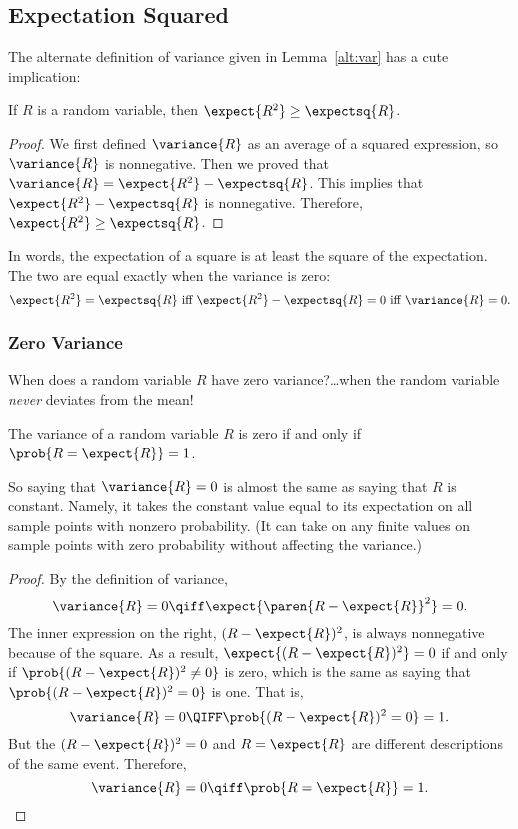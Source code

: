 \begin{editingnotes}
\subsection{Expectation Squared}

The alternate definition of variance given in Lemma~\ref{alt:var} has
a cute implication:
\begin{corollary}
If $R$ is a random variable, then $\expect{R^2} \geq \expectsq{R}$.
\end{corollary}
\begin{proof}
We first defined $\variance{R}$ as an average of a squared expression, so
$\variance{R}$ is nonnegative.  Then we proved that $\variance{R} =
\expect{R^2} - \expectsq{R}$.  This implies that $\expect{R^2} -
\expectsq{R}$ is nonnegative.  Therefore, $\expect{R^2} \geq
\expectsq{R}$.
\end{proof}

In words, the expectation of a square is at least the square of the
expectation. The two are equal exactly when the variance is zero:
\begin{displaymath}
\expect{R^2} = \expectsq{R} \text{  iff  } \expect{R^2} - \expectsq{R} = 0
\text{  iff  } \variance{R} = 0.
\end{displaymath}

\subsubsection*{Zero Variance}

When does a random variable $R$ have zero variance?\dots when the random
variable \emph{never} deviates from the mean!
\begin{lemma*}%
The variance of a random variable $R$ is zero if and only if $\prob{R =
\expect{R}} = 1$.
\end{lemma*}

So saying that $\variance{R}=0$ is almost the same as saying that $R$ is
constant.  Namely, it takes the constant value equal to its expectation on
all sample points with nonzero probability.  (It can take on any finite
values on sample points with zero probability without affecting the
variance.)

\begin{proof}
By the definition of variance,
\[
\variance{R} = 0\qiff \expect{\paren{R - \expect{R}}^2} = 0.
\]
The inner expression on the right, $(R - \expect{R})^2$, is always
nonnegative because of the square.  As a result, $\expect{(R -
\expect{R})^2} = 0$ if and only if $\prob{(R - \expect{R})^2 \neq 0}$ is
zero, which is the same as saying that $\prob{(R - \expect{R})^2 = 0}$ is
one.  That is,
\[
\variance{R} = 0 \QIFF \prob{(R - \expect{R})^2 = 0} = 1.
\]
But the $(R - \expect{R})^2 = 0$ and $R = \expect{R}$ are different
descriptions of the same event.  Therefore,
\[
\variance{R} = 0 \qiff \prob{R = \expect{R}} =1.
\]
\end{proof}

\end{editingnotes}

